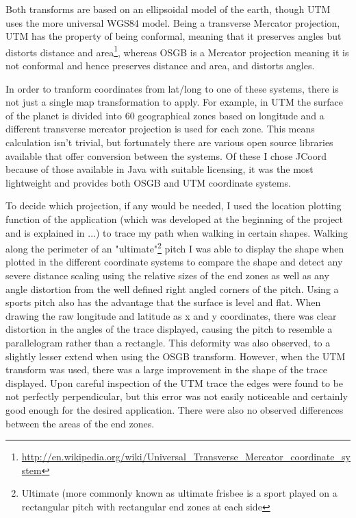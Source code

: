 Both transforms are based on an ellipsoidal model of the earth, though UTM uses the more universal WGS84 model. Being a transverse Mercator projection, UTM has the property of being conformal, meaning that it preserves angles but distorts distance and area\footnote{\url{http://en.wikipedia.org/wiki/Universal_Transverse_Mercator_coordinate_system}}, whereas OSGB is a Mercator projection meaning it is not conformal and hence preserves distance and area, and distorts angles.

In order to tranform coordinates from lat/long to one of these systems, there is not just a single map transformation to apply. For example, in UTM the surface of the planet is divided into 60 geographical zones based on longitude and a different transverse mercator projection is used for each zone. This means calculation isn't trivial, but fortunately there are various open source libraries available that offer conversion between the systems. Of these I chose JCoord because of those available in Java with suitable licensing, it was the most lightweight and provides both OSGB and UTM coordinate systems.

To decide which projection, if any would be needed, I used the location plotting function of the application (which was developed at the beginning of the project and is explained in ...) to trace my path when walking in certain shapes.
Walking along the perimeter of an "ultimate"\footnote{Ultimate (more commonly known as ultimate frisbee is a sport played on a rectangular pitch with rectangular end zones at each side} pitch I was able to display the shape when plotted in the different coordinate systems to compare the shape and detect any severe distance scaling using the relative sizes of the end zones as well as any angle distortion from the well defined right angled corners of the pitch. Using a sports pitch also has the advantage that the surface is level and flat.
When drawing the raw longitude and latitude as x and y coordinates, there was clear distortion in the angles of the trace displayed, causing the pitch to resemble a parallelogram rather than a rectangle. This deformity was also observed, to a slightly lesser extend when using the OSGB transform. However, when the UTM transform was used, there was a large improvement in the shape of the trace displayed. Upon careful inspection of the UTM trace the edges were found to be not perfectly perpendicular, but this error was not easily noticeable and certainly good enough for the desired application. There were also no observed differences between the areas of the end zones.

